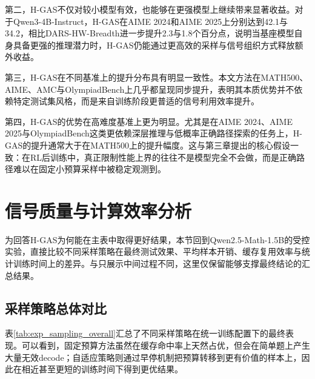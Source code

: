 第二，H-GAS不仅对较小模型有效，也能够在更强模型上继续带来显著收益。对于Qwen3-4B-Instruct，H-GAS在AIME 2024和AIME 2025上分别达到42.1与34.2，相比DARS-HW-Breadth进一步提升2.3与1.8个百分点，说明当基座模型自身具备更强的推理潜力时，H-GAS仍能通过更高效的采样与信号组织方式释放额外收益。

第三，H-GAS在不同基准上的提升分布具有明显一致性。本文方法在MATH500、AIME、AMC与OlympiadBench上几乎都呈现同步提升，表明其本质优势并不依赖特定测试集风格，而是来自训练阶段更普适的信号利用效率提升。

第四，H-GAS的优势在高难度基准上更为明显。尤其是在AIME 2024、AIME 2025与OlympiadBench这类更依赖深层推理与低概率正确路径探索的任务上，H-GAS的提升通常大于在MATH500上的提升幅度。这与第三章提出的核心假设一致：在RL后训练中，真正限制性能上界的往往不是模型完全不会做，而是正确路径难以在固定小预算采样中被稳定观测到。

\section{信号质量与计算效率分析}
\label{sec:exp_efficiency}

为回答H-GAS为何能在主表中取得更好结果，本节回到Qwen2.5-Math-1.5B的受控实验，直接比较不同采样策略在最终测试效果、平均样本开销、缓存复用效率与统计训练时间上的差异。与只展示中间过程不同，这里仅保留能够支撑最终结论的汇总结果。

\subsection{采样策略总体对比}
\label{subsec:exp_sampling_overall}

表\ref{tab:exp_sampling_overall}汇总了不同采样策略在统一训练配置下的最终表现。可以看到，固定预算方法虽然在缓存命中率上天然占优，但会在简单题上产生大量无效decode；自适应策略则通过早停机制把预算转移到更有价值的样本上，因此在相近甚至更短的训练时间下得到更优结果。

